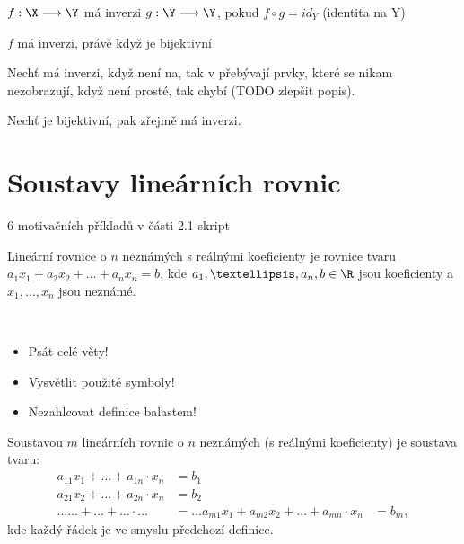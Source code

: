 \documentclass[12pt]{article}					%
\begin{document}
        \begin{definice}[Inverze]
            $f: \X \longrightarrow \Y$ má inverzi $g: \Y \longrightarrow \Y$, pokud $ f \circ g = id_Y$ (identita na Y)
        \end{definice}

        \begin{veta}
            $f$ má inverzi, právě když je bijektivní
            \begin{dukazin}
                Nechť má inverzi, když není na, tak v \Y přebývají prvky, které se nikam nezobrazují, když není prosté, tak chybí (TODO zlepšit popis).

                Nechť je bijektivní, pak zřejmě má inverzi.
            \end{dukazin}
        \end{veta}


        
\section{Soustavy lineárních rovnic}
    6 motivačních příkladů v části 2.1 skript

    \begin{definice}
        Lineární rovnice o $n$ neznámých s reálnými koeficienty je rovnice tvaru $a_1 x_1 + a_2 x_2 + … + a_n x_n = b$, kde $a_1, …, a_n, b \in \R$ jsou koeficienty a $x_1, …, x_n$ jsou neznámé.
    \end{definice}

    \begin{upozorneni}
        \ 
        \begin{itemize}
            \item Psát celé věty!
            \item Vysvětlit použité symboly!
            \item Nezahlcovat definice balastem!
        \end{itemize}
    \end{upozorneni}

    \begin{definice}
        Soustavou $m$ lineárních rovnic o $n$ neznámých (s reálnými koeficienty) je soustava tvaru:
        \begin{align*}
                a_{11} x_1 + … + a_{1n} \cdot x_n &= b_1\\
                a_{21} x_2 + … + a_{2n} \cdot x_n &= b_2\\
                … … + … + …\cdot … &= …
                a_{m1} x_1 + a_{m2} x_2 + … + a_{mn} \cdot x_n &= b_m, 
        \end{align*}
        kde každý řádek je ve smyslu předchozí definice.
    \end{definice}
\end{document}

